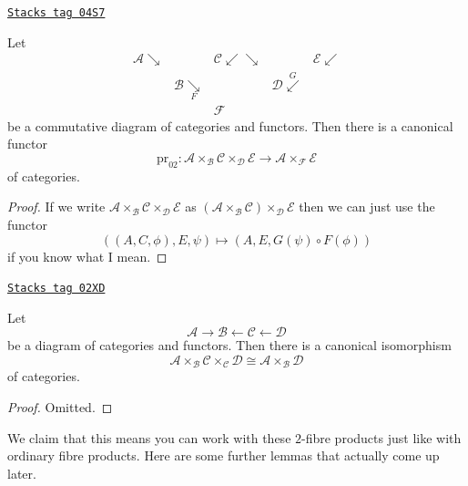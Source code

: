 \begin{lemma}
\label{categories-lemma-triple-2-fibre-product-pr02}
\href{https://stacks.math.columbia.edu/tag/04S7}{\texttt{Stacks tag 04S7}}

Let
$$
\begin{array}{ccccc}\mathcal{A} \searrow &  & \mathcal{C} \swarrow\searrow &  & \mathcal{E} \swarrow \\  & \mathcal{B} \underset{F}{\searrow} &  & \mathcal{D} \overset{G}{\swarrow} &  \\  &  & \mathcal{F} &  & \end{array}
$$
be a commutative diagram of categories and functors.
Then there is a canonical functor
$$
\text{pr}_{02} :
\mathcal{A} \times_\mathcal{B} \mathcal{C} \times_\mathcal{D} \mathcal{E}
\longrightarrow
\mathcal{A} \times_\mathcal{F} \mathcal{E}
$$
of categories.
\end{lemma}

\begin{proof}
If we write
$\mathcal{A} \times_\mathcal{B} \mathcal{C}
\times_\mathcal{D} \mathcal{E}$
as
$(\mathcal{A} \times_\mathcal{B} \mathcal{C})
\times_\mathcal{D} \mathcal{E}$
then we can just use the functor
$$
((A, C, \phi), E, \psi)
\longmapsto
(A, E, G(\psi) \circ F(\phi))
$$
if you know what I mean.
\end{proof}

\begin{lemma}
\label{categories-lemma-2-fibre-product-erase-factor}
\href{https://stacks.math.columbia.edu/tag/02XD}{\texttt{Stacks tag 02XD}}

Let
$$
\mathcal{A} \to
\mathcal{B} \leftarrow \mathcal{C} \leftarrow \mathcal{D}
$$
be a diagram of categories and functors.
Then there is a canonical isomorphism
$$
\mathcal{A} \times_\mathcal{B} \mathcal{C} \times_\mathcal{C} \mathcal{D}
\cong
\mathcal{A} \times_\mathcal{B} \mathcal{D}
$$
of categories.
\end{lemma}

\begin{proof}
Omitted.
\end{proof}

We claim that this means you can work with these $2$-fibre products
just like with ordinary fibre products. Here are some further lemmas
that actually come up later.

